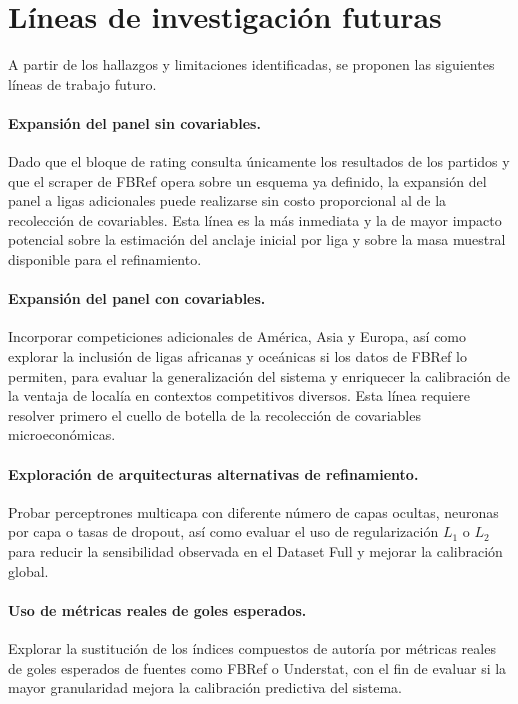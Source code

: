 \section{L\'ineas de investigaci\'on futuras}

A partir de los hallazgos y limitaciones identificadas, se proponen las siguientes l\'ineas de trabajo futuro.

\paragraph{Expansi\'on del panel sin covariables.} Dado que el bloque de rating consulta \'unicamente los resultados de los partidos y que el scraper de FBRef opera sobre un esquema ya definido, la expansi\'on del panel a ligas adicionales puede realizarse sin costo proporcional al de la recolecci\'on de covariables. Esta l\'inea es la m\'as inmediata y la de mayor impacto potencial sobre la estimaci\'on del anclaje inicial por liga y sobre la masa muestral disponible para el refinamiento.

\paragraph{Expansi\'on del panel con covariables.} Incorporar competiciones adicionales de Am\'erica, Asia y Europa, as\'i como explorar la inclusi\'on de ligas africanas y oce\'anicas si los datos de FBRef lo permiten, para evaluar la generalizaci\'on del sistema y enriquecer la calibraci\'on de la ventaja de local\'ia en contextos competitivos diversos. Esta l\'inea requiere resolver primero el cuello de botella de la recolecci\'on de covariables microecon\'omicas.

\paragraph{Exploraci\'on de arquitecturas alternativas de refinamiento.} Probar perceptrones multicapa con diferente n\'umero de capas ocultas, neuronas por capa o tasas de dropout, as\'i como evaluar el uso de regularizaci\'on $L_1$ o $L_2$ para reducir la sensibilidad observada en el Dataset Full y mejorar la calibraci\'on global.

\paragraph{Uso de m\'etricas reales de goles esperados.} Explorar la sustituci\'on de los \'indices compuestos de autor\'ia por m\'etricas reales de goles esperados de fuentes como FBRef o Understat, con el fin de evaluar si la mayor granularidad mejora la calibraci\'on predictiva del sistema.

